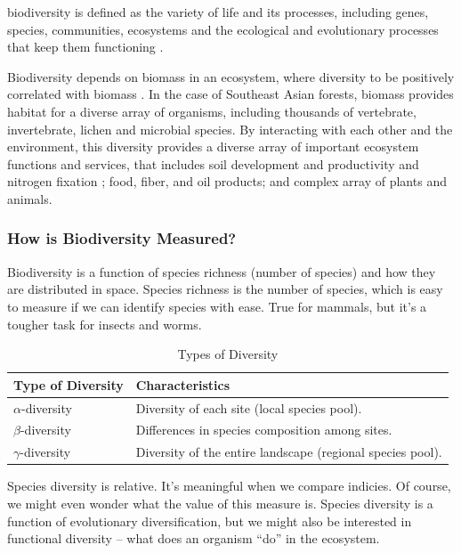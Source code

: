 \Gls{biodiversity} is defined as the variety of life and its processes, including genes, species, communities, ecosystems and the ecological and evolutionary processes that keep them functioning \citep{noss1994saving}. 
 
Biodiversity depends on biomass in an ecosystem, where diversity to be positively correlated with biomass \citep{cardinale2007impacts}. In the case of Southeast Asian forests, biomass provides habitat for a diverse array of organisms, including thousands of vertebrate, invertebrate, lichen and microbial species. By interacting with each other and the environment, this diversity provides a diverse array of important ecosystem functions and services, that includes soil development and productivity and nitrogen fixation \citep{humphrey1999relationships}; food, fiber, and oil products; and complex array of plants and animals.

\subsubsection{How is Biodiversity Measured?}

Biodiversity is a function of species richness (number of species) and how they are distributed in space. Species richness is the number of species, which is easy to measure if we can identify species with ease. True for mammals, but it's a tougher task for insects and worms. 

\begin{table}[htb]
	\caption{Types of Diversity}
	\label{tab:TypesOfDiversity}
	\centering
		\begin{tabular}{ll} \hline
Type of Diversity & Characteristics \\ \hline\hline			
$\alpha$-diversity		& Diversity of each site (local species pool).\\
			
$\beta$-diversity			& Differences in species composition among sites.\\

$\gamma$-diversity		& Diversity of the entire landscape (regional species pool).\\ \hline
	
		\end{tabular}

\end{table}

Species diversity is relative. It's meaningful when we compare indicies. Of course, we might even wonder what the value of this measure is. Species diversity is a function of evolutionary diversification, but we might also be interested in functional diversity -- what does an organism ``do'' in the ecosystem. 

